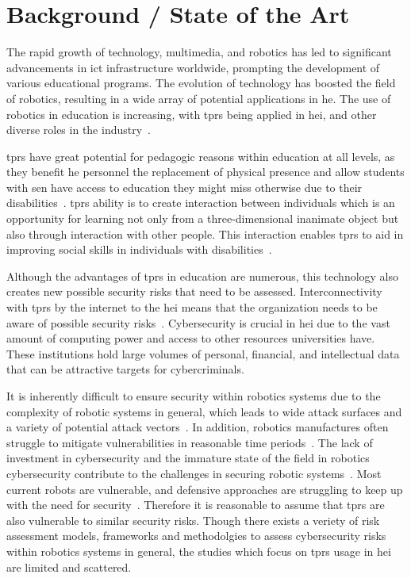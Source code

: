 
\newpage
\section{Background / State of the Art}

The rapid growth of technology, multimedia, and robotics has led to significant advancements in \ac{ict} infrastructure worldwide, prompting
the development of various educational programs. The evolution of technology has boosted the field of robotics, resulting in a wide array
of potential applications in \ac{he}. The use of robotics in education is increasing,
with \ac{tprs} being applied in \ac{hei}, and other diverse roles in the industry~\cite[]{telepresence_robots_in_classroom_2019,higher_edu_perception_on_tprs_2022}.

\ac{tprs} have great potential for pedagogic reasons within education at all levels, as they benefit \ac{he} personnel the replacement of
physical
presence and allow students with \ac{sen} have access to education they might miss otherwise due to their disabilities~\cite[546]{telepresence_robots_in_classroom_2019}.
\ac{tprs} ability is to create interaction between individuals which is an opportunity for learning not only from a three-dimensional
inanimate
object but also through interaction with other people. This interaction enables \ac{tprs} to aid in improving social
skills in individuals with disabilities~\cite[541]{telepresence_robots_in_classroom_2019}.

Although the advantages of \ac{tprs} in education are numerous, this technology also creates new possible security risks that need to be
assessed. Interconnectivity with \ac{tprs} by the internet to the \ac{hei} means that the organization needs to be aware of possible
security risks~\cite[120]{robotics_cyber_security_2022}. Cybersecurity is crucial in \ac{hei} due to the vast amount of computing power and access to other resources
universities
have. These institutions hold large volumes of personal, financial, and intellectual data that can be attractive targets for cybercriminals.

It is inherently difficult to ensure security within robotics systems due to the complexity of robotic systems in general, which leads to
wide
attack surfaces
and a variety
of potential attack vectors~\cite[2]{robot_security_review_2022}. In addition, robotics manufactures often struggle to mitigate
vulnerabilities in reasonable time periods~\cite[12]{robot_security_review_2022}. The lack of investment in cybersecurity and the
immature state of the field in robotics cybersecurity contribute to the challenges in securing robotic systems~\cite[12]{
  robot_security_review_2022}. Most current robots are vulnerable, and defensive approaches
are
struggling
to keep up with the need for security~\cite[12]{robot_security_review_2022}. Therefore it is reasonable to assume that \ac{tprs} are also
vulnerable to similar security risks. Though there exists a veriety of risk assessment models, frameworks and methodolgies to assess
cybersecurity risks within robotics systems in general, the studies which focus on \ac{tprs} usage in \ac{hei} are limited and scattered.

